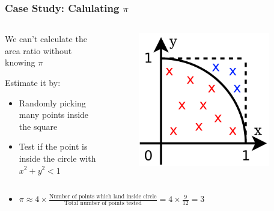 \documentclass[14pt]{beamer}
\begin{document}
\begin{frame}
\frametitle{Case Study: Calulating $\pi$}
\begin{columns}
\begin{column}{0.5\textwidth}
\begin{itemize}
\small{
\item We can't calculate the area ratio without knowing $\pi$
\item Estimate it by:
\begin{itemize}
	\item Randomly picking many points inside the square
	\item Test if the point is inside the circle with $x^2 + y^2 < 1$
	\end{itemize}
}
\end{itemize}
\end{column}
\begin{column}{0.5\textwidth}
\begin{figure}
\includegraphics[width=0.9\textwidth]{pi-dots.png}
\end{figure}
\end{column}
\end{columns}
\begin{itemize}
\item $\pi \approx 4 \times \frac{\textrm{Number of points which land inside circle}}{\textrm{Total number of points tested}} = 4 \times \frac{9}{12} = 3$
\end{itemize}
\end{frame}
\end{document}
